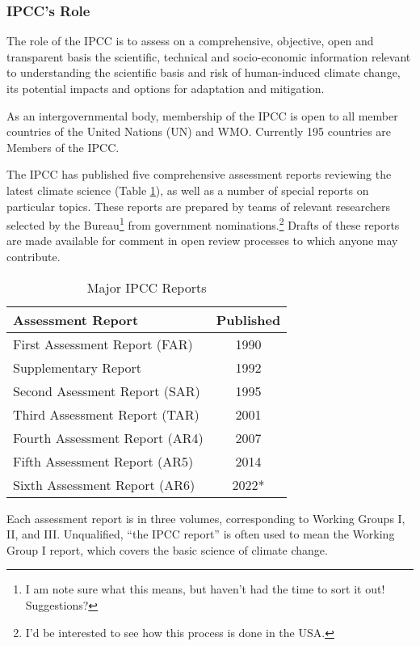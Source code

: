 \documentclass{article}\usepackage[]{graphicx}\usepackage[]{color}
\begin{document}
\subsubsection{IPCC's Role}

The role of the IPCC is to assess on a comprehensive, objective, open and transparent basis the scientific, technical and socio-economic information relevant to understanding the scientific basis and risk of human-induced climate change, its potential impacts and options for adaptation and mitigation.

As an intergovernmental body, membership of the IPCC is open to all member countries of the United Nations (UN) and WMO. Currently 195 countries are Members of the IPCC.

The IPCC has published five comprehensive assessment reports reviewing the latest climate science (Table \ref{tab:IPCC}), as well as a number of special reports on particular topics. These reports are prepared by teams of relevant researchers selected by the Bureau\footnote{I am note sure what this means, but haven't had the time to sort it out!  Suggestions?} from government nominations.\footnote{I'd be interested to see how this process is done in the USA.} Drafts of these reports are made available for comment in open review processes to which anyone may contribute.

\begin{table}
\caption{Major IPCC Reports}\label{tab:IPCC}
\centering
\begin{tabular}{lc}\hline
Assessment Report             & Published \\ \hline\hline
First Assessment Report (FAR) & 1990    \\
Supplementary Report          & 1992   \\
Second Asessment Report (SAR) & 1995    \\
Third Assessment Report (TAR) & 2001    \\
Fourth Assessment Report (AR4)& 2007   \\
Fifth Assessment Report (AR5) & 2014  \\
Sixth Assessment Report (AR6) & 2022*  \\ \hline
\end{tabular}
\end{table}

Each assessment report is in three volumes, corresponding to Working Groups I, II, and III. Unqualified, ``the IPCC report'' is often used to mean the Working Group I report, which covers the basic science of climate change.
\end{document}
